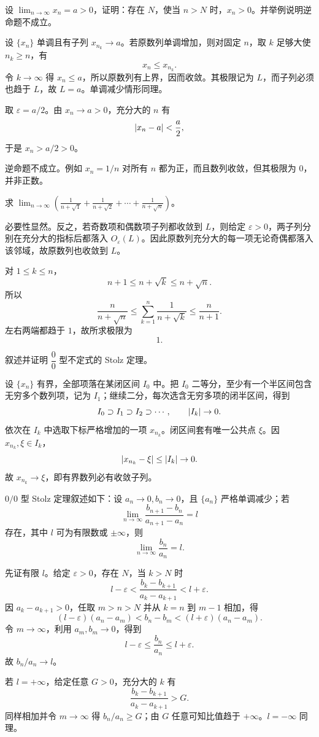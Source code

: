 \begin{xexercise}[2]
设 $\displaystyle\lim_{n\to\infty}x_n=a>0$，证明：存在 $N$，使当 $n>N$ 时，$x_n>0$。并举例说明逆命题不成立。
\end{xexercise}
\begin{xsolution}
设 $\{x_n\}$ 单调且有子列 $x_{n_k}\to a$。若原数列单调增加，则对固定 $n$，取 $k$ 足够大使 $n_k\ge n$，有
\[
  x_n\le x_{n_k}.
\]
令 $k\to\infty$ 得 $x_n\le a$，所以原数列有上界，因而收敛。其极限记为 $L$，而子列必须也趋于 $L$，故 $L=a$。单调减少情形同理。

取 $\varepsilon=a/2$。由 $x_n\to a>0$，充分大的 $n$ 有
\[
  \lvert x_n-a\rvert<\frac a2,
\]
于是 $x_n>a/2>0$。

逆命题不成立。例如 $x_n=1/n$ 对所有 $n$ 都为正，而且数列收敛，但其极限为 $0$，并非正数。
\end{xsolution}


\begin{xexercise}[3]
求 $\displaystyle\lim_{n\to\infty}\left(\frac1{n+\sqrt1}+\frac1{n+\sqrt2}+\cdots+\frac1{n+\sqrt n}\right)$。
\end{xexercise}
\begin{xsolution}
必要性显然。反之，若奇数项和偶数项子列都收敛到 $L$，则给定 $\varepsilon>0$，两子列分别在充分大的指标后都落入 $O_\varepsilon(L)$。因此原数列充分大的每一项无论奇偶都落入该邻域，故原数列也收敛到 $L$。

对 $1\le k\le n$，
\[
  n+1\le n+\sqrt k\le n+\sqrt n.
\]
所以
\[
  \frac n{n+\sqrt n}
  \le\sum_{k=1}^n\frac1{n+\sqrt k}
  \le\frac n{n+1}.
\]
左右两端都趋于 $1$，故所求极限为
\[
  \boxed{1}.
\]
\end{xsolution}


\begin{xexercise}[4]
叙述并证明 $\dfrac00$ 型不定式的 Stolz 定理。
\end{xexercise}
\begin{xsolution}
设 $\{x_n\}$ 有界，全部项落在某闭区间 $I_0$ 中。把 $I_0$ 二等分，至少有一个半区间包含无穷多个数列项，记为 $I_1$；继续二分，每次选含无穷多项的闭半区间，得到
\[
  I_0\supset I_1\supset I_2\supset\cdots,
  \qquad \lvert I_k\rvert\to0.
\]
依次在 $I_k$ 中选取下标严格增加的一项 $x_{n_k}$。闭区间套有唯一公共点 $\xi$。因 $x_{n_k},\xi\in I_k$，
\[
  \lvert x_{n_k}-\xi\rvert\le\lvert I_k\rvert\to0.
\]
故 $x_{n_k}\to\xi$，即有界数列必有收敛子列。

$0/0$ 型 Stolz 定理叙述如下：设 $a_n\to0,b_n\to0$，且 $\{a_n\}$ 严格单调减少；若
\[
  \lim_{n\to\infty}
  \frac{b_{n+1}-b_n}{a_{n+1}-a_n}=l
\]
存在，其中 $l$ 可为有限数或 $\pm\infty$，则
\[
  \lim_{n\to\infty}\frac{b_n}{a_n}=l.
\]

先证有限 $l$。给定 $\varepsilon>0$，存在 $N$，当 $k>N$ 时
\[
  l-\varepsilon<
  \frac{b_k-b_{k+1}}{a_k-a_{k+1}}
  <l+\varepsilon.
\]
因 $a_k-a_{k+1}>0$，任取 $m>n>N$ 并从 $k=n$ 到 $m-1$ 相加，得
\[
  (l-\varepsilon)(a_n-a_m)
  <b_n-b_m
  <(l+\varepsilon)(a_n-a_m).
\]
令 $m\to\infty$，利用 $a_m,b_m\to0$，得到
\[
  l-\varepsilon\le\frac{b_n}{a_n}\le l+\varepsilon.
\]
故 $b_n/a_n\to l$。

若 $l=+\infty$，给定任意 $G>0$，充分大的 $k$ 有
\[
  \frac{b_k-b_{k+1}}{a_k-a_{k+1}}>G.
\]
同样相加并令 $m\to\infty$ 得 $b_n/a_n\ge G$；由 $G$ 任意可知比值趋于 $+\infty$。$l=-\infty$ 同理。
\end{xsolution}


